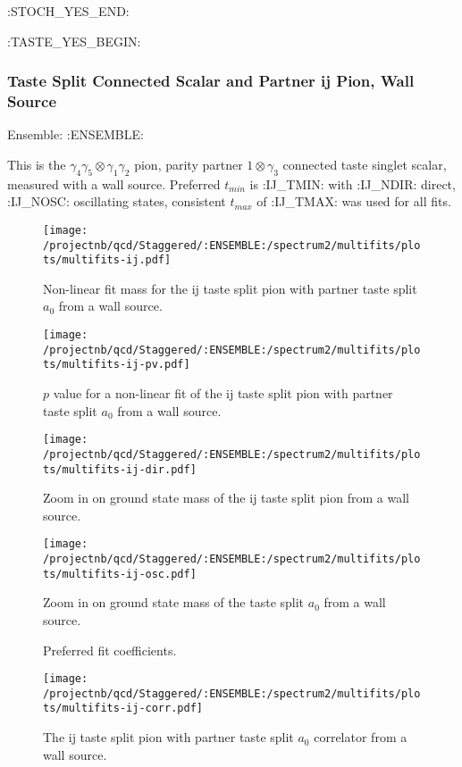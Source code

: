 \clearpage
:STOCH_YES_END:

:TASTE_YES_BEGIN:
\subsubsection{Taste Split Connected Scalar and Partner ij Pion, Wall Source}

Ensemble: :ENSEMBLE:

This is the $\gamma_4 \gamma_5 \otimes \gamma_1 \gamma_2$ pion, parity partner $1 \otimes \gamma_3$ connected taste singlet scalar, measured with a wall source. Preferred $t_{min}$ is :IJ_TMIN: with :IJ_NDIR: direct, :IJ_NOSC: oscillating states, consistent $t_{max}$ of :IJ_TMAX: was used for all fits.

\begin{multicols}{2}
\begin{figure}[H]
\centering
\texttt{[image: /projectnb/qcd/Staggered/:ENSEMBLE:/spectrum2/multifits/plots/multifits-ij.pdf]}
\caption{Non-linear fit mass for the ij taste split pion with partner taste split $a_0$ from a wall source.}
\end{figure}
\columnbreak
\begin{figure}[H]
\centering
\texttt{[image: /projectnb/qcd/Staggered/:ENSEMBLE:/spectrum2/multifits/plots/multifits-ij-pv.pdf]}
\caption{$p$ value for a non-linear fit of the ij taste split pion with partner taste split $a_0$ from a wall source.}
\end{figure}
\end{multicols}

\begin{multicols}{2}
\begin{figure}[H]
\centering
\texttt{[image: /projectnb/qcd/Staggered/:ENSEMBLE:/spectrum2/multifits/plots/multifits-ij-dir.pdf]}
\caption{Zoom in on ground state mass of the ij taste split pion from a wall source.}
\end{figure}
\columnbreak
\begin{figure}[H]
\centering
\texttt{[image: /projectnb/qcd/Staggered/:ENSEMBLE:/spectrum2/multifits/plots/multifits-ij-osc.pdf]}
\caption{Zoom in on ground state mass of the taste split $a_0$ from a wall source.}
\end{figure}
\end{multicols}

\begin{multicols}{2}
\begin{figure}[H]
\centering
\scriptsize

\caption{Preferred fit coefficients.}
\end{figure}
\columnbreak
\begin{figure}[H]
\centering
\texttt{[image: /projectnb/qcd/Staggered/:ENSEMBLE:/spectrum2/multifits/plots/multifits-ij-corr.pdf]}
\caption{The ij taste split pion with partner taste split $a_0$ correlator from a wall source.}
\end{figure}
\end{multicols}

